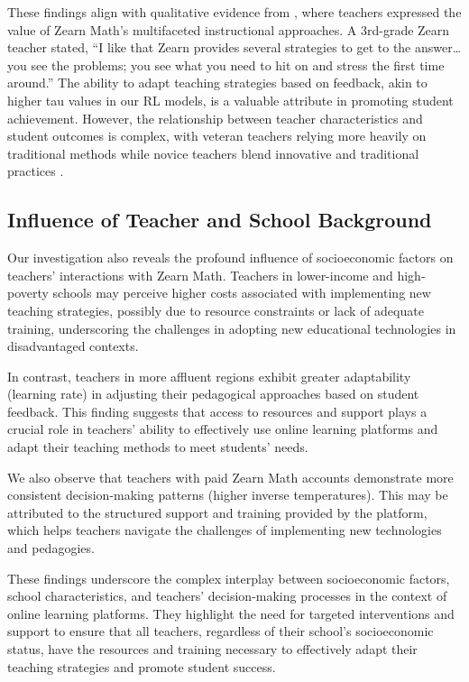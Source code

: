 \documentclass[
  number,
  preprint,
  3p,
  onecolumn]{elsarticle}
\begin{document}
These findings align with qualitative evidence from \citep{knudsen2020},
where teachers expressed the value of Zearn Math's multifaceted
instructional approaches. A 3rd-grade Zearn teacher stated, ``I like
that Zearn provides several strategies to get to the answer\ldots you
see the problems; you see what you need to hit on and stress the first
time around.'' The ability to adapt teaching strategies based on
feedback, akin to higher tau values in our RL models, is a valuable
attribute in promoting student achievement. However, the relationship
between teacher characteristics and student outcomes is complex, with
veteran teachers relying more heavily on traditional methods while
novice teachers blend innovative and traditional practices
\citep{knudsen2020}.

\subsection{Influence of Teacher and School
Background}\label{influence-of-teacher-and-school-background}

Our investigation also reveals the profound influence of socioeconomic
factors on teachers' interactions with Zearn Math. Teachers in
lower-income and high-poverty schools may perceive higher costs
associated with implementing new teaching strategies, possibly due to
resource constraints or lack of adequate training, underscoring the
challenges in adopting new educational technologies in disadvantaged
contexts.

In contrast, teachers in more affluent regions exhibit greater
adaptability (learning rate) in adjusting their pedagogical approaches
based on student feedback. This finding suggests that access to
resources and support plays a crucial role in teachers' ability to
effectively use online learning platforms and adapt their teaching
methods to meet students' needs.

We also observe that teachers with paid Zearn Math accounts demonstrate
more consistent decision-making patterns (higher inverse temperatures).
This may be attributed to the structured support and training provided
by the platform, which helps teachers navigate the challenges of
implementing new technologies and pedagogies.

These findings underscore the complex interplay between socioeconomic
factors, school characteristics, and teachers' decision-making processes
in the context of online learning platforms. They highlight the need for
targeted interventions and support to ensure that all teachers,
regardless of their school's socioeconomic status, have the resources
and training necessary to effectively adapt their teaching strategies
and promote student success.
\end{document}
